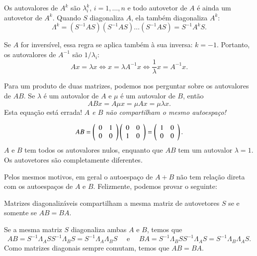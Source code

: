 \begin{teo}
  Os autovalores de $A^k$ são $\lambda_i^k$, $i=1,\ldots,n$ e todo autovetor de $A$ é ainda um autovetor de $A^k$. Quando $S$ diagonaliza $A$, ela também diagonaliza $A^k$:
  \begin{equation*}
    \Lambda^k = (S^{-1}AS)(S^{-1}AS)\ldots (S^{-1}AS) = S^{-1}A^k S.
  \end{equation*}
\end{teo}

Se $A$ for inversível, essa regra se aplica também à sua inversa: $k=-1$. Portanto, os autovalores de $A^{-1}$ são $1/\lambda_i$: 
\begin{equation*}
  Ax=\lambda x \Leftrightarrow x=\lambda A^{-1}x \Leftrightarrow \frac{1}{\lambda}x = A^{-1}x.
\end{equation*}

Para um produto de duas matrizes, podemos nos perguntar sobre os autovalores de $AB$. Se $\lambda$ é um autovalor de $A$ e $\mu$ é um autovalor de $B$, então
\begin{equation*}
  ABx = A\mu x = \mu Ax = \mu \lambda x.
\end{equation*}
Esta equação está errada! \emph{$A$ e $B$ não compartilham o mesmo autoespaço!}

\begin{exemplo}
  \begin{equation*}
    AB = \left(
      \begin{array}{c c}
        0 & 1\\
        0 & 0
      \end{array}
    \right) \left(
      \begin{array}{c c}
        0 & 0\\
        1 & 0
      \end{array}
    \right) = \left(
      \begin{array}{c c}
        1 & 0\\
        0 & 0
      \end{array}
    \right).
  \end{equation*}
  $A$ e $B$ tem todos os autovalores nulos, enquanto que $AB$ tem um autovalor $\lambda =1$. Os autovetores são completamente diferentes. 
\end{exemplo}

Pelos mesmos motivos, em geral o autoespaço de $A+B$ não tem relação direta com os autoespaços de $A$ e $B$. Felizmente, podemos provar o seguinte:
\begin{teo}
  Matrizes diagonalizáveis compartilham a mesma matriz de autovetores $S$ se e somente se $AB=BA$.
\end{teo}
\bpr
Se a mesma matriz $S$ diagonaliza ambas $A$ e $B$, temos que
\begin{equation*}
  AB = S^{-1}\Lambda_A S S^{-1} \Lambda_B S  = S^{-1}\Lambda_A\Lambda_BS \quad \mbox{ e } \quad BA = S^{-1}\Lambda_BSS^{-1}\Lambda_AS = S^{-1}\Lambda_B \Lambda_A S.
\end{equation*}
Como matrizes diagonais sempre comutam, temos que $AB=BA$.

